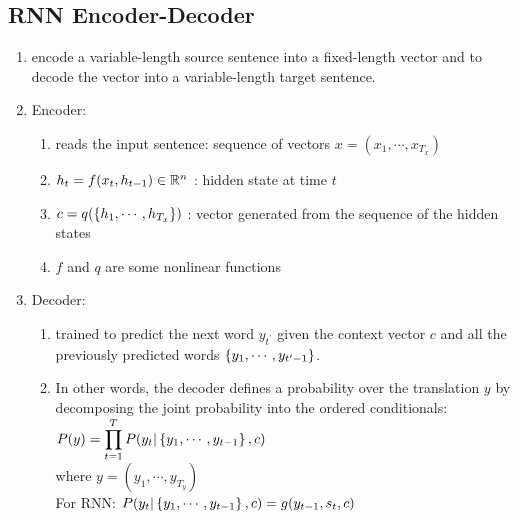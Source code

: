 \subsection{RNN Encoder-Decoder}
\begin{enumerate}
    \item encode a variable-length source sentence into a fixed-length vector and to decode the vector into a variable-length target sentence.
    \hfill \cite{adv-ml-tech/paper/arxiv.org/1409.0473}

    \item Encoder:
    \begin{enumerate}
        \item reads the input sentence: sequence of vectors $x = (x_1, \cdots, x_{T_x})$
        \hfill \cite{adv-ml-tech/paper/arxiv.org/1409.0473}

        \item $h_t = f(x_t, h_{t-1}) \in \mathbb{R}^n$ : hidden state at time $t$
        \hfill \cite{adv-ml-tech/paper/arxiv.org/1409.0473}

        \item $c = q(\left\{h_1, \cdots, h_{T_x}\right\})$ :  vector generated from the sequence of the hidden states
        \hfill \cite{adv-ml-tech/paper/arxiv.org/1409.0473}

        \item $f$ and $q$ are some nonlinear functions
        \hfill \cite{adv-ml-tech/paper/arxiv.org/1409.0473}
    \end{enumerate}

    \item Decoder:
    \begin{enumerate}
        \item trained to predict the next word $y_{t^\prime}$ given the context vector $c$ and all the previously predicted words $\left\{y_1, \cdots , y_{t^\prime-1}\right\}$.
        \hfill \cite{adv-ml-tech/paper/arxiv.org/1409.0473}

        \item In other words, the decoder defines a probability over the translation $y$ by decomposing the joint probability into the ordered conditionals:\\
        $
            P(y)
            = \displaystyle\prod_{t=1}^T P(y_t | \left\{y_1, \cdots, y_{t-1}\right\}, c)
        $
        \hfill \cite{adv-ml-tech/paper/arxiv.org/1409.0473}
        \\
        where $y = (y_1, \cdots, y_{T_y})$
        \hfill \cite{adv-ml-tech/paper/arxiv.org/1409.0473}
        \\
        For RNN:
        $
            P(y_t | \left\{y_1, \cdots, y_{t-1}\right\}, c)
            = g(y_{t-1}, s_t, c)
        $
        \hfill \cite{adv-ml-tech/paper/arxiv.org/1409.0473}


\end{enumerate}
\end{enumerate}
